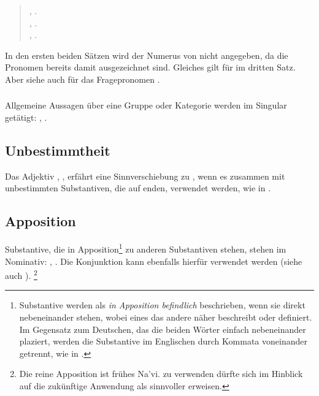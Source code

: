 \begin{quotation}
\noindent{}, .\\
\noindent{}, .\\
\noindent{}, .
\end{quotation}

\noindent In den ersten beiden S\"atzen wird der Numerus von  nicht
angegeben, da die Pronomen bereits damit ausgezeichnet sind. Gleiches gilt f\"ur
 im dritten Satz. Aber siehe auch  f\"ur das
Fragepronomen .

\subsubsection{} Allgemeine Aussagen \"uber eine Gruppe oder Kategorie werden
im Singular get\"atigt: ,
.

\subsection{Unbestimmtheit} Das Adjektiv , ,
erf\"ahrt eine Sinnverschiebung zu ,
wenn es zusammen mit unbestimmten Substantiven, die auf  enden, verwendet
werden, wie in  .

\subsection{Apposition} Substantive, die in Apposition\footnote{Substantive werden
als \textit{in Apposition befindlich} beschrieben, wenn sie direkt nebeneinander
stehen, wobei eines das andere n\"aher beschreibt oder definiert. Im Gegensatz zum
Deutschen, das die beiden W\"orter einfach nebeneinander plaziert, werden die
Substantive im Englischen durch Kommata voneinander getrennt, wie in .} zu anderen Substantiven
stehen, stehen im Nominativ: , . Die Konjunktion
 kann ebenfalls hierf\"ur verwendet werden (siehe auch ).
\footnote{Die reine Apposition ist fr\"uhes Na’vi.  zu verwenden d\"urfte sich
im Hinblick auf die zuk\"unftige Anwendung als sinnvoller erweisen.}

